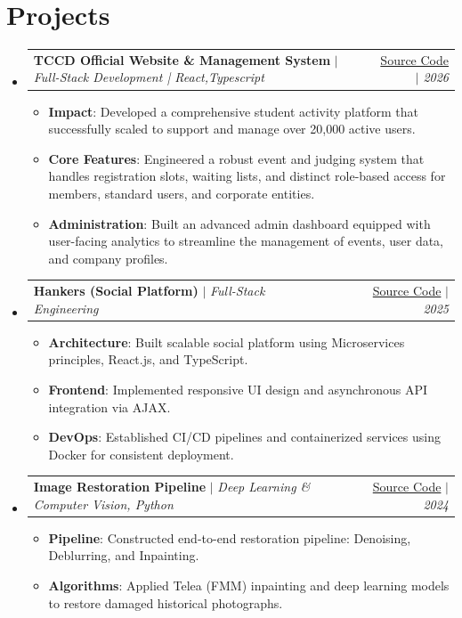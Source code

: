 \documentclass[letterpaper,11pt]{article}
\makeatletter
\newcommand{\resumeItem}[2]{\item\small{\textbf{#1}{: #2 \vspace{-2pt}}}}
\newcommand{\resumeProjectSubheading}[4]{
  \vspace{-1pt}\item
    \begin{tabular*}{0.97\textwidth}{l@{\extracolsep{\fill}}r}
      \textbf{#1} $|$ \textit{\small#3} & \href{#2}{Source Code} $|$ \textit{\small #4} \\
    \end{tabular*}\vspace{-5pt}
}
\newcommand{\resumeSubHeadingListStart}{\begin{itemize}[leftmargin=*]}
\newcommand{\resumeSubHeadingListEnd}{\end{itemize}}
\newcommand{\resumeItemListStart}{\begin{itemize}}
\newcommand{\resumeItemListEnd}{\end{itemize}\vspace{-5pt}}
\makeatother
\begin{document}
\section{Projects}
  \resumeSubHeadingListStart
    \resumeProjectSubheading
      {TCCD Official Website \& Management System}{https://tccd.eng.cu.edu.eg/}{Full-Stack Development | React,Typescript}{2026}
      \resumeItemListStart
        \resumeItem{Impact}
          {Developed a comprehensive student activity platform that successfully scaled to support and manage over 20,000 active users.}
        \resumeItem{Core Features}
          {Engineered a robust event and judging system that handles registration slots, waiting lists, and distinct role-based access for members, standard users, and corporate entities.}
        \resumeItem{Administration}
          {Built an advanced admin dashboard equipped with user-facing analytics to streamline the management of events, user data, and company profiles.}
      \resumeItemListEnd
    \vspace{4pt}
    \resumeProjectSubheading
      {Hankers (Social Platform)}{https://github.com/SWEProject25}{Full-Stack Engineering}{2025}
      \resumeItemListStart
        \resumeItem{Architecture}
          {Built scalable social platform using Microservices principles, React.js, and TypeScript.}
        \resumeItem{Frontend}
          {Implemented responsive UI design and asynchronous API integration via AJAX.}
        \resumeItem{DevOps}
          {Established CI/CD pipelines and containerized services using Docker for consistent deployment.}
      \resumeItemListEnd
    \vspace{4pt}
    \resumeProjectSubheading
      {Image Restoration Pipeline}{https://github.com/ahmedfathy0-0/Image-Colorization-of-Historical-Photos}{Deep Learning \& Computer Vision, Python}{2024}
      \resumeItemListStart
        \resumeItem{Pipeline}
          {Constructed end-to-end restoration pipeline: Denoising, Deblurring, and Inpainting.}
        \resumeItem{Algorithms}
          {Applied Telea (FMM) inpainting and deep learning models to restore damaged historical photographs.}
      \resumeItemListEnd
  \resumeSubHeadingListEnd
\end{document}
